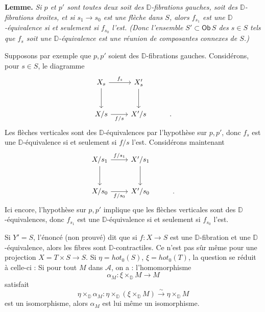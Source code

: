 \documentclass[11pt,leqno]{article}
\newcommand{\printedpage}[1]{\marginpar{\footnotesize p.~#1}}
\newcommand{\msp}[1]{\marginpar{\footnotesize [#1]}}
\newcommand{\DD}{\mathbb{D}}
\newcommand{\Ob}{\mathsf{Ob}}
\begin{document}
\textbf{Lemme.} \textit{Si $p$ et $p'$ sont toutes deux soit des $\DD$-fibrations gauches, soit des $\DD$-fibrations droites, et si $s_1 \to s_0$ est une flèche dans $S$, alors $f_{s_1}$ est une $\DD$-équivalence si et seulement si $f_{s_0}$ l'est. (Donc l'ensemble $S' \subset \Ob\, S$ des $s \in S$ tels que $f_s$ soit une $\DD$-équivalence est une réunion de composantes connexes de $S$.)}

\indent Supposons par exemple que $p,p'$ soient des $\DD$-fibrations gauches. Considérons, pour $s \in S$, le diagramme
\[
\begin{tikzcd}[row sep=large]
X_s \arrow[r, "f_s"] \arrow[d] & X'_s \arrow[d] \\
X/s \arrow[r, "f/s"'] & X'/s & .
\end{tikzcd}
\]
Les flèches verticales sont des $\DD$-équivalences par l'hypothèse sur $p,p'$, donc $f_s$ est une $\DD$-équivalence si et seulement si $f/s$ l'est. Considérons maintenant
\[
\begin{tikzcd}[row sep=large]
X/s_1 \arrow[r, "f/s_1"] \arrow[d] & X'/s_1 \arrow[d] \\
X/s_0 \arrow[r, "f/s_0"'] & X'/s_0 & .
\end{tikzcd}
\]
Ici encore, l'hypothèse sur $p,p'$ implique que les flèches verticales sont des $\DD$-équivalences, donc $f_{s_1}$ est une $\DD$-équivalence si et seulement si $f_{s_0}$ l'est.

\msp{page 86}

Si $Y' = S$, l'énoncé (non prouvé) dit que si $f : X \to S$ est une $\DD$-fibration et une $\DD$-équivalence, alors les fibres sont $\DD$-contractiles. Ce n'est pas sûr même pour une projection $X = T \times S \to S$. Si $\eta = \mathit{hot}_0(S)$, $\xi = \mathit{hot}_0(T)$, la question se réduit à celle-ci : Si pour tout $M$ dans $\mathcal{A}$, on a : l'homomorphisme
\[
\alpha_M : \xi \times_{\DD} M \longrightarrow M
\]
\printedpage{53}
satisfait
\[
\eta \times_{\DD} \alpha_M : \eta \times_{\DD} (\xi \times_{\DD} M) \xrightarrow{\sim} \eta \times_{\DD} M
\]
est un isomorphisme, alors $\alpha_M$ est lui même un isomorphisme.

\msp{page 87}
\end{document}
